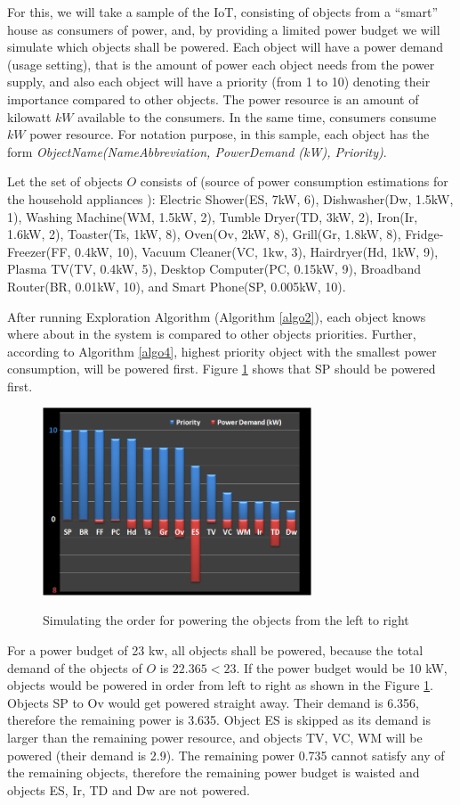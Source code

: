 \documentclass[letterpaper, 10 pt, conference]{ieeeconf}
\begin{document}
For this, we will take a sample of the IoT, consisting of objects from a ``smart'' house as consumers of power, and, by providing a limited power budget we will simulate which objects shall be powered. Each object will have a power demand (usage setting), that is the amount of power each object needs from the power supply, and also each object will have a priority (from 1 to 10) denoting their importance compared to other objects. The power resource is an amount of kilowatt $kW$ available to the consumers. In the same time, consumers consume $kW$ power resource. For notation purpose, in this sample, each object has the form \emph{ObjectName(NameAbbreviation, PowerDemand (kW), Priority)}.

Let the set of objects $O$ consists of (source of power consumption estimations for the household appliances \cite{bworld}): Electric Shower(ES, 7kW, 6), Dishwasher(Dw, 1.5kW, 1), Washing Machine(WM, 1.5kW, 2), Tumble Dryer(TD, 3kW, 2), Iron(Ir, 1.6kW, 2), Toaster(Ts, 1kW, 8), Oven(Ov, 2kW, 8), Grill(Gr, 1.8kW, 8), Fridge-Freezer(FF, 0.4kW, 10), Vacuum Cleaner(VC, 1kw, 3), Hairdryer(Hd, 1kW, 9), Plasma TV(TV, 0.4kW, 5), Desktop Computer(PC, 0.15kW, 9), Broadband Router(BR, 0.01kW, 10), and Smart Phone(SP, 0.005kW, 10).

After running Exploration Algorithm (Algorithm \ref{algo2}), each object knows where about in the system is compared to other objects priorities. Further, according to Algorithm \ref{algo4}, highest priority object with the smallest power consumption, will be powered first. Figure \ref{fig2} shows that SP should be powered first.
\begin{figure}[h]
  \centering
  \includegraphics[width=80mm]{results.png}\\
  \caption{Simulating the order for powering the objects from the left to right}\label{fig2}
\end{figure}

For a power budget of 23 kw, all objects shall be powered, because the total demand of the objects of $O$ is $22.365<23$. If the power budget would be 10 kW, objects would be powered in order from left to right as shown in the Figure \ref{fig2}. Objects SP to Ov would get powered straight away. Their demand is 6.356, therefore the remaining power is 3.635. Object ES is skipped as its demand is larger than the remaining power resource, and objects TV, VC, WM will be powered (their demand is 2.9). The remaining power 0.735 cannot satisfy any of the remaining objects, therefore the remaining power budget is waisted and objects ES, Ir, TD and Dw are not powered.
\end{document}

